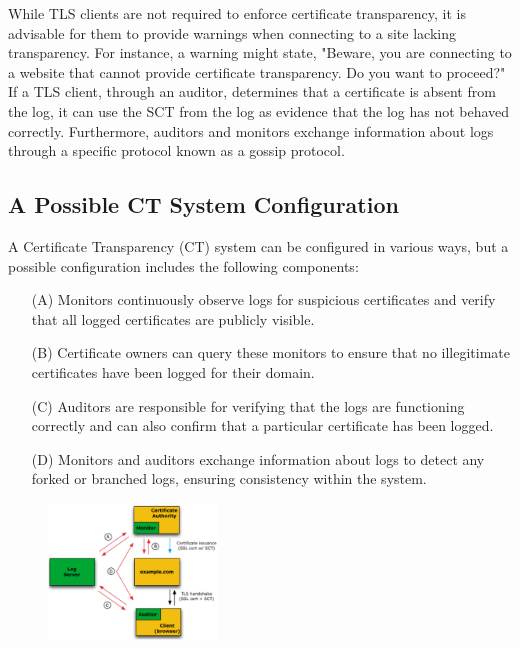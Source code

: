 While TLS clients are not required to enforce certificate
transparency, it is advisable for them to provide warnings when
connecting to a site lacking transparency. For instance, a warning
might state, "Beware, you are connecting to a website that cannot
provide certificate transparency. Do you want to proceed?" If a TLS
client, through an auditor, determines that a certificate is absent
from the log, it can use the SCT from the log as evidence that the log
has not behaved correctly. Furthermore, auditors and monitors exchange
information about logs through a specific protocol known as a gossip
protocol.

\subsection{A Possible CT System Configuration}

A Certificate Transparency (CT) system can be configured in various
ways, but a possible configuration includes the following components:

\begin{itemize}
    \item[(A)] Monitors continuously observe logs for suspicious
      certificates and verify that all logged certificates are
      publicly visible.
    \item[(B)] Certificate owners can query these monitors to ensure
      that no illegitimate certificates have been logged for their
      domain.
    \item[(C)] Auditors are responsible for verifying that the logs
      are functioning correctly and can also confirm that a particular
      certificate has been logged.
    \item[(D)] Monitors and auditors exchange information about logs
      to detect any forked or branched logs, ensuring consistency
      within the system.
\end{itemize}

\begin{figure}
  \centering
  \includegraphics[width=0.4\textwidth]{img/x509 ct system.png}
  \label{fig:ct system}

\end{figure}

